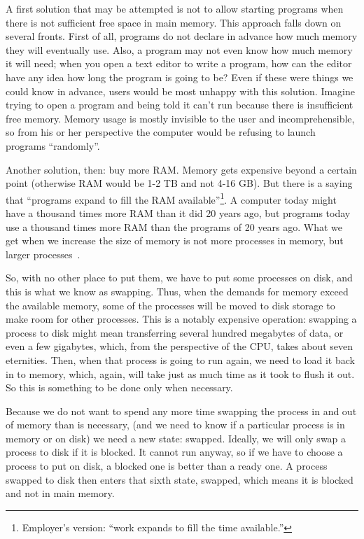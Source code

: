 A first solution that may be attempted is not to allow starting programs when there is not sufficient free space in main memory. This approach falls down on several fronts. First of all, programs do not declare in advance how much memory they will eventually use. Also, a program may not even know how much memory it will need; when you open a text editor to write a program, how can the editor have any idea how long the program is going to be? Even if these were things we could know in advance, users would be most unhappy with this solution. Imagine trying to open a program and being told it can't run because there is insufficient free memory. Memory usage is mostly invisible to the user and incomprehensible, so from his or her perspective the computer would be refusing to launch programs ``randomly''.

Another solution, then: buy more RAM. Memory gets expensive beyond a certain point (otherwise RAM would be 1-2 TB and not 4-16 GB). But there is a saying that ``programs expand to fill the RAM available''\footnote{Employer's version: ``work expands to fill the time available.''}. A computer today might have a thousand times more RAM than it did 20 years ago, but programs today use a thousand times more RAM than the programs of 20 years ago. What we get when we increase the size of memory is not more processes in memory, but larger processes~\cite{osi}.

So, with no other place to put them, we have to put some processes on disk, and this is what we know as swapping. Thus, when the demands for memory exceed the available memory, some of the processes will be moved to disk storage to make room for other processes. This is a notably expensive operation: swapping a process to disk might mean transferring several hundred megabytes of data, or even a few gigabytes, which, from the perspective of the CPU, takes about seven eternities. Then, when that process is going to run again, we need to load it back in to memory, which, again, will take just as much time as it took to flush it out. So this is something to be done only when necessary.

Because we do not want to spend any more time swapping the process in and out of memory than is necessary, (and we need to know if a particular process is in memory or on disk) we need a new state: swapped.  Ideally, we will only swap a process to disk if it is blocked. It cannot run anyway, so if we have to choose a process to put on disk, a blocked one is better than a ready one. A process swapped to disk then enters that sixth state, swapped, which means it is blocked and not in main memory.

